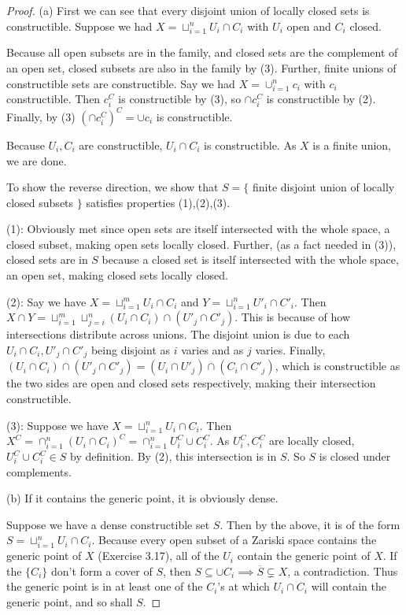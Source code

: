 \begin{proof}
	(a) First we can see that every disjoint union of locally closed sets is constructible.
	Suppose we had $X = \sqcup_{i=1}^n U_i\cap C_i$ with $U_i$ open and $C_i$ closed.

	Because all open subsets are in the family, and closed sets are the complement of an open set, closed subsets are also in the family by (3).
	Further, finite unions of constructible sets are constructible.
	Say we had $X = \cup_{i=1}^n c_i$ with $c_i$ constructible.
	Then $c_i^C$ is constructible by (3), so $\cap c_i^C$ is constructible by (2).
	Finally, by (3) $(\cap c_i^C)^C = \cup c_i$ is constructible.

	Because $U_i,C_i$ are constructible, $U_i\cap C_i$ is constructible.
	As $X$ is a finite union, we are done.

	To show the reverse direction, we show that $S = \{$ finite disjoint union of locally closed subsets $\}$ satisfies properties (1),(2),(3).

	(1): Obviously met since open sets are itself intersected with the whole space, a closed subset, making open sets locally closed.
	Further, (as a fact needed in (3)), closed sets are in $S$ because a closed set is itself intersected with the whole space, an open set, making closed sets locally closed.

	(2): Say we have $X=\sqcup_{i= 1}^m U_i\cap C_i$ and $Y = \sqcup_{i=1}^n U'_i\cap C'_i$.
	Then $X\cap Y = \sqcup_{i=1}^m\sqcup_{j=i}^n (U_i\cap C_i)\cap (U'_j \cap C'_j)$.
	This is because of how intersections distribute across unions.
	The disjoint union is due to each $U_i\cap C_i, U'_j\cap C'_j$ being disjoint as $i$ varies and as $j$ varies.
	Finally, $(U_i \cap C_i)\cap (U'_j \cap C'_j) = (U_i\cap U'_j) \cap (C_i\cap C'_j)$, which is constructible as the two sides are open and closed sets respectively, making their intersection constructible.

	(3): Suppose we have $X = \sqcup_{i=1}^n U_i\cap C_i$.
	Then $X^C = \cap_{i=1}^n (U_i\cap C_i)^C = \cap_{i=1}^n U_i^C\cup C_i^C$.
	As $U_i^C,C_i^C$ are locally closed, $U_i^C\cup C_i^C \in S$ by definition.
	By (2), this intersection is in $S$.
	So $S$ is closed under complements.

	(b) If it contains the generic point, it is obviously dense.

	Suppose we have a dense constructible set $S$.
	Then by the above, it is of the form $S = \sqcup_{i=1}^n U_i\cap C_i$.
	Because every open subset of a Zariski space contains the generic point of $X $ (Exercise 3.17), all of the $U_i $ contain the generic point of $X $.
	If the $\{C_i\}   $ don't form a cover of $S $, then $S \subseteq \cup C_i \implies \overline{S} \subsetneq X  $, a contradiction.
	Thus the generic point is in at least one of the $C_i $'s at which $U_i\cap C_i $ will contain the generic point, and so shall $S $.


\end{proof}
